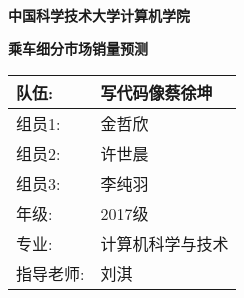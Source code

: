 \documentclass{article}
\begin{document}
\begin{center}
    \ 
    \\[1cm]
    \Huge{\textbf{中国科学技术大学计算机学院}}
    \vspace{20mm}
    
    \huge{}
    \vspace{2mm}
    
    \huge{}
    \vspace{1.5cm}
    
    \huge{\textbf{乘车细分市场销量预测}}
    \vspace{4cm}
    
    \Large{
        \begin{tabular}{|l|l|}
            \hline
            队伍: & 写代码像蔡徐坤\\
            \hline
            组员1: & 金哲欣\\
            \hline
            组员2: & 许世晨\\
            \hline
            组员3: & 李纯羽\\
            \hline
            年级:  & 2017级\\
            \hline
            专业: & 计算机科学与技术\\
            \hline
            指导老师: & 刘淇\\
            \hline
        \end{tabular}
    }
    \vspace{1.5cm}

    \vspace{0.5cm}

    \end{center}

    \newpage

    \tableofcontents

    \newpage
\end{document}

